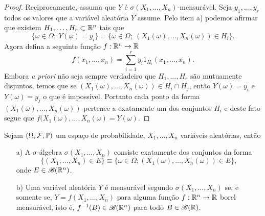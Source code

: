 \begin{proof}
Reciprocamente, assuma que $Y$ é $\sigma(X_1,\ldots,X_n)$-mensurável.
Seja $y_1,\ldots,y_r$ todos os valores que a variável aleatória 
$Y$ assume. Pelo item a) podemos afirmar que existem 
$H_1,\ldots,H_r\subset \mathbb{R}^n$ tais que 
	\[
	\{\omega\in\Omega;\ Y(\omega)=y_i\}
	=
	\{\omega\in\Omega;\ (X_1(\omega),\ldots,X_n(\omega))\in H_i\}.
	\]
Agora defina a seguinte função $f:\mathbb{R}^n\to\mathbb{R}$
	\[
		f(x_1,\ldots,x_n)=\sum_{i=1}^r y_i 1_{H_i}(x_1,\ldots,x_n).
	\] 
Embora {\it a priori} não seja sempre verdadeiro que $H_1,\ldots,H_r$
são mutuamente disjuntos, temos que se 
$(X_1(\omega),\ldots,X_n(\omega))\in H_i\cap H_j$,
então $Y(\omega)=y_i$ e $Y(\omega)=y_j$ o que é impossível.
Portanto cada ponto da forma $(X_1(\omega),\ldots,X_n(\omega))$
pertence a exatamente um dos conjuntos $H_i$ e deste fato segue 
que $f(X_1(\omega),\ldots,X_n(\omega)=Y(\omega)$.
\end{proof}






















\begin{teorema}\label{teo-f(X1,...,X_n)-sigma(X1,...,X_n)}
	Sejam $(\Omega,\mathcal{F},\mathbb{P})$ um espaço de probabilidade,
	$X_1,\ldots,X_n$ variáveis aleatórias, então 
\begin{itemize}
	\item[a)]
	A $\sigma$-álgebra $\sigma(X_1,\ldots,X_n)$ 
	consiste exatamente dos conjuntos da forma
	\[
		\{(X_1,\ldots,X_n)\in E\} 
		\equiv
		\{\omega\in\Omega; (X_1(\omega),\ldots,X_n(\omega))\in E\},
	\]
	onde $E\in \mathscr{B}(\mathbb{R}^n)$.
	
	\item[b)]
	Uma variável aleatória $Y$ é mensurável segundo 
	$\sigma(X_1,\ldots,X_n)$ se, e somente se,
	$Y=f(X_1,\ldots,X_n)$ para alguma função 
	$f:\mathbb{R}^n\to\mathbb{R}$ borel mensurável,
	isto é, $f^{-1}(B)\in\mathscr{B}(\mathbb{R}^n)$ para todo
	$B\in\mathscr{B}(\mathbb{R})$.
\end{itemize}
\end{teorema}


